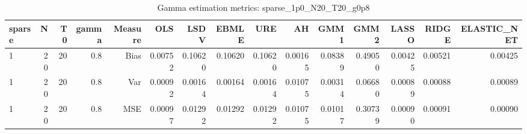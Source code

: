 \begin{table}[!htbp]\centering
\caption{Gamma estimation metrics: sparse_1p0_N20_T20_g0p8}
\label{tab:table1_sparse_1p0_N20_T20_g0p8}
\begin{tabular}{lrrrrrrrrrrrrrr}
\hline
sparse & N & T0 & gamma & Measure & OLS & LSDV & EBMLE & URE & AH & GMM1 & GMM2 & LASSO & RIDGE & ELASTIC_NET \\
\hline
1 & 20 & 20 & 0.8 & Bias & 0.00752 & 0.10620 & 0.10620 & 0.10620 & 0.00165 & 0.08389 & 0.49050 & 0.00425 & 0.00521 & 0.00425 \\
1 & 20 & 20 & 0.8 & Var & 0.00092 & 0.00164 & 0.00164 & 0.00164 & 0.01075 & 0.00314 & 0.06680 & 0.00089 & 0.00088 & 0.00089 \\
1 & 20 & 20 & 0.8 & MSE & 0.00097 & 0.01292 & 0.01292 & 0.01292 & 0.01075 & 0.01017 & 0.30739 & 0.00090 & 0.00091 & 0.00090 \\
\hline
\end{tabular}
\end{table}

